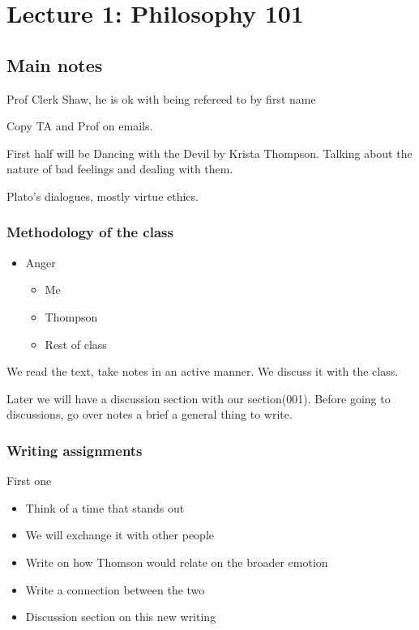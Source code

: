 \section{Lecture 1: Philosophy 101}

\subsection{Main notes}
Prof Clerk Shaw, he is ok with being refereed to by first name

Copy TA and Prof on emails.

First half will be Dancing with the Devil by Krista Thompson. Talking about the nature of bad feelings and dealing with them.

Plato's dialogues, mostly virtue ethics.
\subsubsection{Methodology of the class}
\begin{itemize}
	\item Anger
        \begin{itemize}
          \item Me
          \item Thompson
          \item Rest of class
        \end{itemize}
\end{itemize}

We read the text, take notes in an active manner. We discuss it with the class.

Later we will have a discussion section with our section(001). Before going to discussions, go over notes a brief a general thing to write.

\subsubsection{Writing assignments}
First one
\begin{itemize}
	\item Think of a time that stands out
  \item We will exchange it with other people
  \item Write on how Thomson would relate on the broader emotion
  \item Write a connection between the two
  \item Discussion section on this new writing
\end{itemize}

